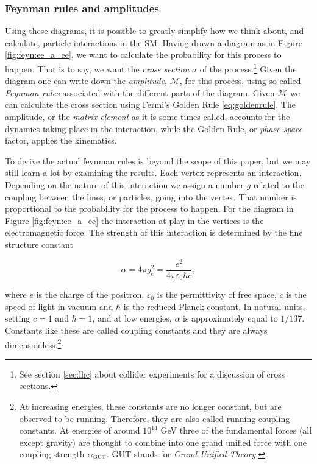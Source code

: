 \subsubsection{Feynman rules and amplitudes}
Using these diagrams, it is possible to greatly simplify how we think about, and calculate, particle interactions in the SM. Having drawn a diagram as in Figure \ref{fig:feyn:ee_a_ee}, we want to calculate the probability for this process to happen. That is to say, we want the \emph{cross section} $\sigma$ of the process.\footnote{See section \ref{sec:lhc} about collider experiments for a discussion of cross sections.} Given the diagram one can write down the \emph{amplitude}, $\mathcal{M}$, for this process, using so called \emph{Feynman rules} associated with the different parts of the diagram. Given $\mathcal{M}$ we can calculate the cross section using Fermi's Golden Rule \eqref{eq:goldenrule}. The amplitude, or the \emph{matrix element} as it is some times called, accounts for the dynamics taking place in the interaction, while the Golden Rule, or \emph{phase space} factor, applies the kinematics.

To derive the actual feynman rules is beyond the scope of this paper, but we may still learn a lot by examining the results. Each vertex represents an interaction. Depending on the nature of this interaction we assign a number $g$ related to the coupling between the lines, or particles, going into the vertex. That number is proportional to the probability for the process to happen. For the diagram in Figure \ref{fig:feyn:ee_a_ee} the interaction at play in the vertices is the electromagnetic force. The strength of this interaction is determined by the fine structure constant

\begin{equation}
	\alpha = 4\pi g_e^2 = \frac{e^2}{4\pi\varepsilon_0\hbar c},
\end{equation}

where $e$ is the charge of the positron, $\varepsilon_0$ is the permittivity of free space, $c$ is the speed of light in vacuum and $\hbar$ is the reduced Planck constant. In natural units, setting $c = 1$ and $\hbar = 1$, and at low energies, $\alpha$ is approximately equal to $1/137$. Constants like these are called coupling constants and they are always dimensionless.\footnote{At increasing energies, these constants are no longer constant, but are observed to be running. Therefore, they are also called running coupling constants. At energies of around $10^{14}$ GeV three of the fundamental forces (all except gravity) are thought to combine into one grand unified force with one coupling strength $\alpha_{\textrm{\tiny{GUT}}}$. GUT stands for \emph{Grand Unified Theory}.}

